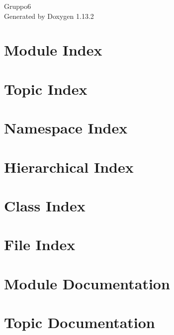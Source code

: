 \documentclass[twoside]{book}
\newcommand{\+}{\discretionary{\mbox{\scriptsize$\hookleftarrow$}}{}{}}
\newcommand{\clearemptydoublepage}{%
    \newpage{\pagestyle{empty}\cleardoublepage}%
  }
\begin{document}
  \raggedbottom
    \hypersetup{pageanchor=false,
                bookmarksnumbered=true,
                pdfencoding=unicode
               }
  \begin{titlepage}
  \vspace*{7cm}
  \begin{center}%
  {\Large Gruppo6}\\
  \vspace*{1cm}
  {\large Generated by Doxygen 1.13.2}\\
  \end{center}
  \end{titlepage}
  \clearemptydoublepage
  \tableofcontents
  \clearemptydoublepage
  \hypersetup{pageanchor=true}

\chapter{Module Index}

\chapter{Topic Index}

\chapter{Namespace Index}

\chapter{Hierarchical Index}

\chapter{Class Index}

\chapter{File Index}

\chapter{Module Documentation}

\chapter{Topic Documentation}




\end{document}
